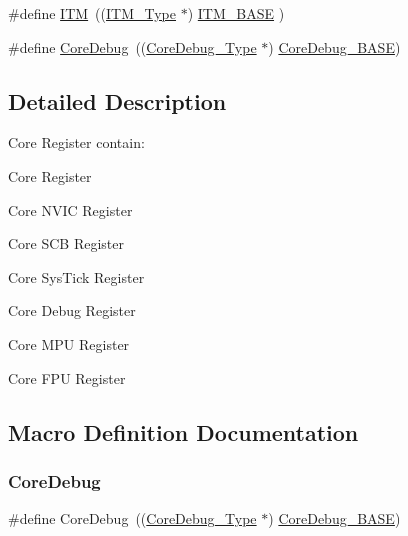 \begin{DoxyCompactItemize}
\item 
\#define \hyperlink{group___c_m_s_i_s__core__register_gabae7cdf882def602cb787bb039ff6a43}{I\+TM}~((\hyperlink{struct_i_t_m___type}{I\+T\+M\+\_\+\+Type}       $\ast$)     \hyperlink{group___c_m_s_i_s__core__register_gadd76251e412a195ec0a8f47227a8359e}{I\+T\+M\+\_\+\+B\+A\+SE}      )
\item 
\#define \hyperlink{group___c_m_s_i_s__core__register_gab6e30a2b802d9021619dbb0be7f5d63d}{Core\+Debug}~((\hyperlink{struct_core_debug___type}{Core\+Debug\+\_\+\+Type} $\ast$)     \hyperlink{group___c_m_s_i_s__core__register_ga680604dbcda9e9b31a1639fcffe5230b}{Core\+Debug\+\_\+\+B\+A\+SE})
\end{DoxyCompactItemize}


\subsection{Detailed Description}
Core Register contain\+:
\begin{DoxyItemize}
\item Core Register
\item Core N\+V\+IC Register
\item Core S\+CB Register
\item Core Sys\+Tick Register
\item Core Debug Register
\item Core M\+PU Register
\item Core F\+PU Register 
\end{DoxyItemize}

\subsection{Macro Definition Documentation}
\mbox{\label{group___c_m_s_i_s__core__register_gab6e30a2b802d9021619dbb0be7f5d63d}} 
\subsubsection{\texorpdfstring{Core\+Debug}{CoreDebug}}
{\footnotesize\ttfamily \#define Core\+Debug~((\hyperlink{struct_core_debug___type}{Core\+Debug\+\_\+\+Type} $\ast$)     \hyperlink{group___c_m_s_i_s__core__register_ga680604dbcda9e9b31a1639fcffe5230b}{Core\+Debug\+\_\+\+B\+A\+SE})}

